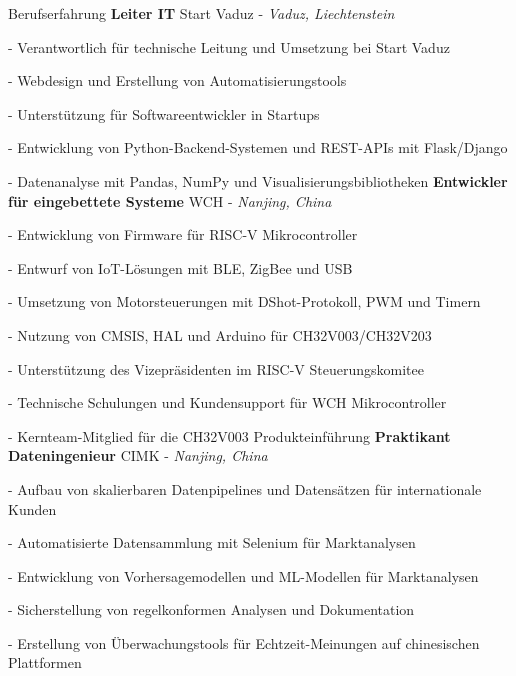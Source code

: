 \begin{rubric}{Berufserfahrung}
	\textbf{Leiter IT} Start Vaduz - \emph{Vaduz, Liechtenstein}
	\par - Verantwortlich für technische Leitung und Umsetzung bei Start Vaduz
	\par - Webdesign und Erstellung von Automatisierungstools
	\par - Unterstützung für Softwareentwickler in Startups
	\par - Entwicklung von Python-Backend-Systemen und REST-APIs mit Flask/Django
	\par - Datenanalyse mit Pandas, NumPy und Visualisierungsbibliotheken
	\entry*[2021 -- 2024]%
	\textbf{Entwickler für eingebettete Systeme} WCH - \emph{Nanjing, China}
	\par - Entwicklung von Firmware für RISC-V Mikrocontroller
	\par - Entwurf von IoT-Lösungen mit BLE, ZigBee und USB
	\par - Umsetzung von Motorsteuerungen mit DShot-Protokoll, PWM und Timern
	\par - Nutzung von CMSIS, HAL und Arduino für CH32V003/CH32V203
	\par - Unterstützung des Vizepräsidenten im RISC-V Steuerungskomitee
	\par - Technische Schulungen und Kundensupport für WCH Mikrocontroller
	\par - Kernteam-Mitglied für die CH32V003 Produkteinführung
	\entry*[2020]%
	\textbf{Praktikant Dateningenieur} CIMK - \emph{Nanjing, China}
	\par - Aufbau von skalierbaren Datenpipelines und Datensätzen für internationale Kunden
	\par - Automatisierte Datensammlung mit Selenium für Marktanalysen
	\par - Entwicklung von Vorhersagemodellen und ML-Modellen für Marktanalysen
	\par - Sicherstellung von regelkonformen Analysen und Dokumentation
	\par - Erstellung von Überwachungstools für Echtzeit-Meinungen auf chinesischen Plattformen
\end{rubric}
